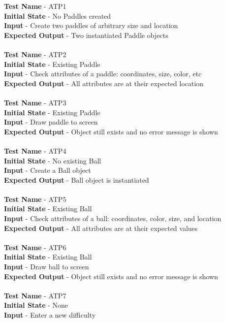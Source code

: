 \documentclass[12pt, titlepage]{article}
\begin{document}
\textbf{Test Name} - ATP1\\
\textbf{Initial State} - No Paddles created\\
\textbf{Input} - Create two paddles of arbitrary size and location\\
\textbf{Expected Output} - Two instantiated Paddle objects\\ \\
\textbf{Test Name} - ATP2\\
\textbf{Initial State} - Existing Paddle\\
\textbf{Input} - Check attributes of a paddle: coordinates, size, color, etc\\
\textbf{Expected Output} - All attributes are at their expected location\\ \\
\textbf{Test Name} - ATP3\\
\textbf{Initial State} - Existing Paddle\\
\textbf{Input} - Draw paddle to screen\\
\textbf{Expected Output} - Object still exists and no error message is shown\\ \\
\textbf{Test Name} - ATP4\\
\textbf{Initial State} - No existing Ball\\
\textbf{Input} - Create a Ball object\\
\textbf{Expected Output} - Ball object is instantiated\\ \\
\textbf{Test Name} - ATP5\\
\textbf{Initial State} - Existing Ball\\
\textbf{Input} - Check attributes of a ball: coordinates, color, size, and location\\
\textbf{Expected Output} - All attributes are at their expected values\\ \\
\textbf{Test Name} - ATP6\\
\textbf{Initial State} - Existing Ball\\
\textbf{Input} - Draw ball to screen\\
\textbf{Expected Output} - Object still exists and no error message is shown\\ \\
\textbf{Test Name} - ATP7\\
\textbf{Initial State} - None\\
\textbf{Input} - Enter a new difficulty\\
\end{document}
